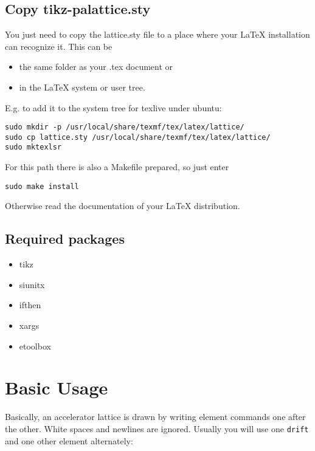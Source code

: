\documentclass[a4paper]{scrartcl}
\begin{document}
\subsection{Copy tikz-palattice.sty}
\label{sec-1-1}
You just need to copy the lattice.sty file to a place where your \LaTeX{} installation can recognize it.
This can be
\begin{itemize}
\item the same folder as your .tex document or
\item in the \LaTeX{} system or user tree.
\end{itemize}
E.g. to add it to the system tree for texlive under ubuntu:
\begin{lstlisting}
sudo mkdir -p /usr/local/share/texmf/tex/latex/lattice/
sudo cp lattice.sty /usr/local/share/texmf/tex/latex/lattice/
sudo mktexlsr
\end{lstlisting}
For this path there is also a Makefile prepared, so just enter
\begin{lstlisting}
sudo make install
\end{lstlisting}
Otherwise read the documentation of your \LaTeX{} distribution.

\subsection{Required packages}
\label{sec-1-2}
\begin{itemize}
\item tikz
\item siunitx
\item ifthen
\item xargs
\item etoolbox
\end{itemize}

\lstset{language=[LaTeX]TeX}

\section{Basic Usage}
\label{sec:remarks}

Basically, an accelerator lattice is drawn by writing element commands one after the
other. White spaces and newlines are ignored. Usually you will use one \lstinline+drift+
and one other element alternately:
\end{document}
